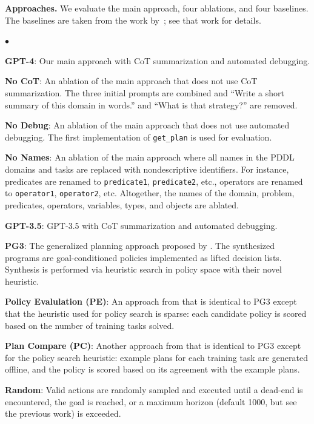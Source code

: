 \documentclass[letterpaper]{article} %
\newenvironment{tightlist}%
{\begin{list}{$\bullet$}{%
    \setlength{\topsep}{0in}
    \setlength{\partopsep}{0in}
    \setlength{\itemsep}{0in}
    \setlength{\parsep}{0in}
    \setlength{\leftmargin}{1.5em}
    \setlength{\rightmargin}{0in}
}
}%
{\end{list}
}
\begin{document}
\textbf{Approaches.}
We evaluate the main approach, four ablations, and four baselines.
The baselines are taken from the work by~\citet{yang2022pg3}; see that work for details.

\vspace{2pt}
\begin{tightlist}
\item \textbf{GPT-4}: Our main approach with CoT summarization and automated debugging.
\item \textbf{No CoT}: An ablation of the main approach that does not use CoT summarization. The three initial prompts are combined and ``Write a short summary of this domain in words.'' and ``What is that strategy?'' are removed.
\item \textbf{No Debug}: An ablation of the main approach that does not use automated debugging. The first implementation of \texttt{get\_plan} is used for evaluation.
\item \textbf{No Names}: An ablation of the main approach where all names in the PDDL domains and tasks are replaced with nondescriptive identifiers. For instance, predicates are renamed to \texttt{predicate1}, \texttt{predicate2}, etc., operators are renamed to \texttt{operator1}, \texttt{operator2}, etc. Altogether, the names of the domain, problem, predicates, operators, variables, types, and objects are ablated.
\item \textbf{GPT-3.5}: GPT-3.5 with CoT summarization and automated debugging.
\item \textbf{PG3}: The generalized planning approach proposed by \citet{yang2022pg3}. The synthesized programs are goal-conditioned policies implemented as lifted decision lists. Synthesis is performed via heuristic search in policy space with their novel heuristic.
\item \textbf{Policy Evalulation (PE)}: An approach from \citet{yang2022pg3} that is identical to PG3 except that the heuristic used for policy search is sparse: each candidate policy is scored based on the number of training tasks solved.
\item \textbf{Plan Compare (PC)}: Another approach from \citet{yang2022pg3} that is identical to PG3 except for the policy search heuristic: example plans for each training task are generated offline, and the policy is scored based on its agreement with the example plans.
\item \textbf{Random}: Valid actions are randomly sampled and executed until a dead-end is encountered, the goal is reached, or a maximum horizon (default 1000, but see the previous work) is exceeded.
\end{tightlist}
\vspace{2pt}
\end{document}
